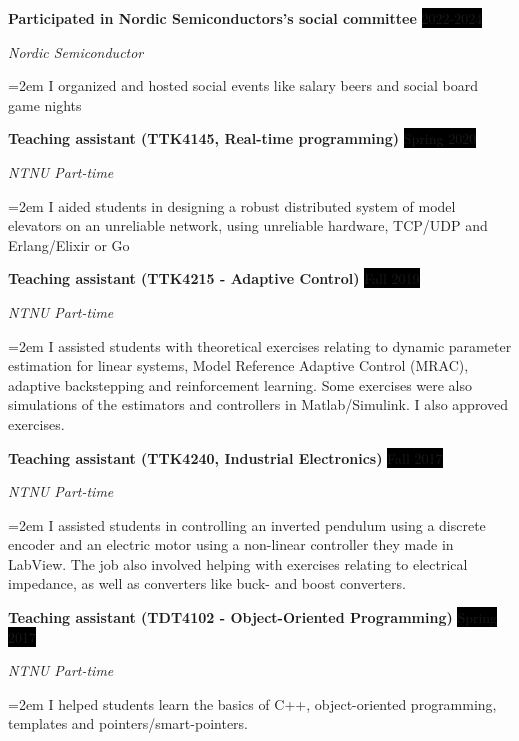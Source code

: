 \documentclass[paper=a4,fontsize=11pt,norsk]{scrartcl} %
\newcommand{\EducationEntry}[4]{
		\noindent \textbf{#1} \hfill      %
		\colorbox{Black}{%
			\parbox{6em}{%
			\hfill\color{White}#2}} \par  %
		\noindent \textit{#3} \par        %
		\noindent\hangindent=2em\hangafter=0 \small #4 %
		\normalsize \par}
\newcommand{\WorkEntry}[4]{				  %
		\noindent \textbf{#1} \hfill      %
		\colorbox{Black}{\color{White}#2} \par  %
		\noindent \textit{#3} \par              %
		\noindent\hangindent=2em\hangafter=0 \small #4 %
		\normalsize \par}
\begin{document}




\WorkEntry{Participated in Nordic Semiconductors's social committee}{2022-2024}{Nordic Semiconductor}
{I organized and hosted social events like salary beers and social board game nights}

\WorkEntry{Teaching assistant (TTK4145, Real-time programming)}{Spring 2020}{NTNU Part-time}
{I aided students in designing a robust distributed system of model elevators on an unreliable network, using unreliable hardware, TCP/UDP and Erlang/Elixir or Go}

\WorkEntry{Teaching assistant (TTK4215 - Adaptive Control)}{Fall 2019}{NTNU Part-time}
{I assisted students with theoretical exercises relating to dynamic parameter estimation for linear systems, Model Reference Adaptive Control (MRAC), adaptive backstepping and reinforcement learning. Some exercises were also simulations of the estimators and controllers in Matlab/Simulink. I also approved exercises.
}


\WorkEntry{Teaching assistant (TTK4240, Industrial Electronics)}{Fall 2017}{NTNU Part-time}
{I assisted students in controlling an inverted pendulum using a discrete encoder and an electric motor using a non-linear controller they made in LabView. The job also involved helping with exercises relating to electrical impedance, as well as converters like buck- and boost converters.
}

\WorkEntry{Teaching assistant (TDT4102 - Object-Oriented Programming)}{Spring 2017}{NTNU Part-time}
{I helped students learn the basics of C++, object-oriented programming, templates and pointers/smart-pointers.
}
\end{document}
